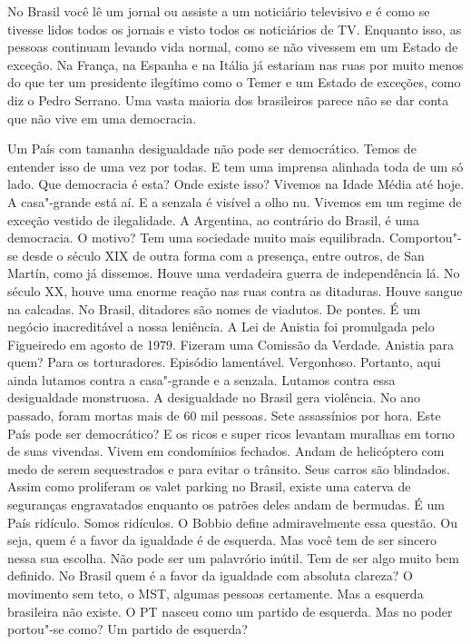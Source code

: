 \falaG No Brasil você lê um jornal ou assiste a um noticiário televisivo e é
como se tivesse lidos todos os jornais e visto todos os noticiários de
TV. Enquanto isso, as pessoas continuam levando vida normal, como se não
vivessem em um Estado de exceção. Na França, na Espanha e na Itália já
estariam nas ruas por muito menos do que ter um presidente ilegítimo
como o Temer e um Estado de exceções, como diz o Pedro Serrano. Uma
vasta maioria dos brasileiros parece não se dar conta que não vive em
uma democracia.

\falaM Um País com tamanha desigualdade não pode ser democrático. Temos de
entender isso de uma vez por todas. E tem uma imprensa alinhada toda de
um só lado. Que democracia é esta? Onde existe isso? Vivemos na Idade
Média até hoje. A casa"-grande está aí. E a senzala é visível a olho nu.
Vivemos em um regime de exceção vestido de ilegalidade. A Argentina, ao
contrário do Brasil, é uma democracia. O motivo? Tem uma sociedade muito
mais equilibrada. Comportou"-se desde o século XIX de outra forma com a
presença, entre outros, de San Martín, como já dissemos. Houve uma
verdadeira guerra de independência lá. No século XX, houve uma enorme
reação nas ruas contra as ditaduras. Houve sangue na calcadas. No
Brasil, ditadores são nomes de viadutos. De pontes. É um negócio
inacreditável a nossa leniência. A Lei de Anistia foi promulgada pelo
Figueiredo em agosto de 1979. Fizeram uma Comissão da Verdade. Anistia
para quem? Para os torturadores. Episódio lamentável. Vergonhoso.
Portanto, aqui ainda lutamos contra a casa"-grande e a senzala. Lutamos
contra essa desigualdade monstruosa. A desigualdade no Brasil gera
violência. No ano passado, foram mortas mais de 60 mil pessoas. Sete
assassínios por hora. Este País pode ser democrático? E os ricos e super
ricos levantam muralhas em torno de suas vivendas. Vivem em condomínios
fechados. Andam de helicóptero com medo de serem sequestrados e para
evitar o trânsito. Seus carros são blindados. Assim como proliferam os
valet parking no Brasil, existe uma caterva de seguranças engravatados
enquanto os patrões deles andam de bermudas. É um País ridículo. Somos
ridículos. O Bobbio define admiravelmente essa questão. Ou seja, quem é
a favor da igualdade é de esquerda. Mas você tem de ser sincero nessa
sua escolha. Não pode ser um palavrório inútil. Tem de ser algo muito
bem definido. No Brasil quem é a favor da igualdade com absoluta
clareza? O movimento sem teto, o MST, algumas pessoas certamente. Mas a
esquerda brasileira não existe. O PT nasceu como um partido de esquerda.
Mas no poder portou"-se como? Um partido de esquerda?

